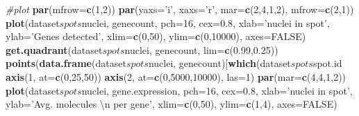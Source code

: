 \documentclass[]{book}
\newenvironment{Shaded}{\begin{snugshade}}{\end{snugshade}}
\newcommand{\KeywordTok}[1]{\textcolor[rgb]{0.13,0.29,0.53}{\textbf{{#1}}}}
\newcommand{\DataTypeTok}[1]{\textcolor[rgb]{0.13,0.29,0.53}{{#1}}}
\newcommand{\DecValTok}[1]{\textcolor[rgb]{0.00,0.00,0.81}{{#1}}}
\newcommand{\FloatTok}[1]{\textcolor[rgb]{0.00,0.00,0.81}{{#1}}}
\newcommand{\CharTok}[1]{\textcolor[rgb]{0.31,0.60,0.02}{{#1}}}
\newcommand{\StringTok}[1]{\textcolor[rgb]{0.31,0.60,0.02}{{#1}}}
\newcommand{\CommentTok}[1]{\textcolor[rgb]{0.56,0.35,0.01}{\textit{{#1}}}}
\newcommand{\OtherTok}[1]{\textcolor[rgb]{0.56,0.35,0.01}{{#1}}}
\newcommand{\NormalTok}[1]{{#1}}
\theoremstyle{definition}
\theoremstyle{definition}
\theoremstyle{remark}
\begin{document}
\begin{Shaded}
\begin{Highlighting}[]
\CommentTok{#plot}
\KeywordTok{par}\NormalTok{(}\DataTypeTok{mfrow=}\KeywordTok{c}\NormalTok{(}\DecValTok{1}\NormalTok{,}\DecValTok{2}\NormalTok{))}
\KeywordTok{par}\NormalTok{(}\DataTypeTok{yaxs=}\StringTok{'i'}\NormalTok{, }\DataTypeTok{xaxs=}\StringTok{'r'}\NormalTok{, }\DataTypeTok{mar=}\KeywordTok{c}\NormalTok{(}\DecValTok{2}\NormalTok{,}\DecValTok{4}\NormalTok{,}\DecValTok{1}\NormalTok{,}\DecValTok{2}\NormalTok{), }\DataTypeTok{mfrow=}\KeywordTok{c}\NormalTok{(}\DecValTok{2}\NormalTok{,}\DecValTok{1}\NormalTok{))}
\KeywordTok{plot}\NormalTok{(dataset$spots$nuclei, genecount, }\DataTypeTok{pch=}\DecValTok{16}\NormalTok{, }\DataTypeTok{cex=}\FloatTok{0.8}\NormalTok{, }\DataTypeTok{xlab=}\StringTok{'nuclei in spot'}\NormalTok{, }\DataTypeTok{ylab=}\StringTok{'Genes detected'}\NormalTok{, }\DataTypeTok{xlim=}\KeywordTok{c}\NormalTok{(}\DecValTok{0}\NormalTok{,}\DecValTok{50}\NormalTok{), }\DataTypeTok{ylim=}\KeywordTok{c}\NormalTok{(}\DecValTok{0}\NormalTok{,}\DecValTok{10000}\NormalTok{), }\DataTypeTok{axes=}\OtherTok{FALSE}\NormalTok{)}
\KeywordTok{get.quadrant}\NormalTok{(dataset$spots$nuclei, genecount, }\DataTypeTok{lim=}\KeywordTok{c}\NormalTok{(}\FloatTok{0.99}\NormalTok{,}\FloatTok{0.25}\NormalTok{))}
\KeywordTok{points}\NormalTok{(}\KeywordTok{data.frame}\NormalTok{(dataset$spots$nuclei, genecount)[}\KeywordTok{which}\NormalTok{(dataset$spots$spot.id%in%}\KeywordTok{c}\NormalTok{(}\DecValTok{693}\NormalTok{,}\DecValTok{706}\NormalTok{)),], }\DataTypeTok{pch=}\DecValTok{21}\NormalTok{, }\DataTypeTok{bg=}\KeywordTok{c}\NormalTok{(}\StringTok{'#998ec3'}\NormalTok{,}\StringTok{'#f1a340'}\NormalTok{), }\DataTypeTok{col=}\KeywordTok{c}\NormalTok{(}\StringTok{'#542788'}\NormalTok{, }\StringTok{'#b35806'}\NormalTok{), }\DataTypeTok{cex=}\FloatTok{1.2}\NormalTok{, }\DataTypeTok{lwd=}\FloatTok{1.5}\NormalTok{)}
\KeywordTok{axis}\NormalTok{(}\DecValTok{1}\NormalTok{, }\DataTypeTok{at=}\KeywordTok{c}\NormalTok{(}\DecValTok{0}\NormalTok{,}\DecValTok{25}\NormalTok{,}\DecValTok{50}\NormalTok{)) }
\KeywordTok{axis}\NormalTok{(}\DecValTok{2}\NormalTok{, }\DataTypeTok{at=}\KeywordTok{c}\NormalTok{(}\DecValTok{0}\NormalTok{,}\DecValTok{5000}\NormalTok{,}\DecValTok{10000}\NormalTok{), }\DataTypeTok{las=}\DecValTok{1}\NormalTok{)}
\KeywordTok{par}\NormalTok{(}\DataTypeTok{mar=}\KeywordTok{c}\NormalTok{(}\DecValTok{4}\NormalTok{,}\DecValTok{4}\NormalTok{,}\DecValTok{1}\NormalTok{,}\DecValTok{2}\NormalTok{))}
\KeywordTok{plot}\NormalTok{(dataset$spots$nuclei, gene.expression, }\DataTypeTok{pch=}\DecValTok{16}\NormalTok{, }\DataTypeTok{cex=}\FloatTok{0.8}\NormalTok{, }\DataTypeTok{xlab=}\StringTok{'nuclei in spot'}\NormalTok{, }\DataTypeTok{ylab=}\StringTok{'Avg. molecules }\CharTok{\textbackslash{}n}\StringTok{ per gene'}\NormalTok{, }\DataTypeTok{xlim=}\KeywordTok{c}\NormalTok{(}\DecValTok{0}\NormalTok{,}\DecValTok{50}\NormalTok{), }\DataTypeTok{ylim=}\KeywordTok{c}\NormalTok{(}\DecValTok{1}\NormalTok{,}\DecValTok{4}\NormalTok{), }\DataTypeTok{axes=}\OtherTok{FALSE}\NormalTok{)}
}
\end{Highlighting}
\end{Shaded}
\end{document}
